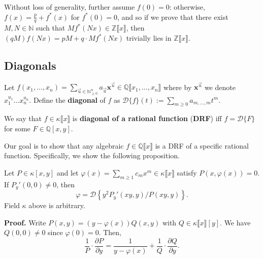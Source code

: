 \documentclass{template}
\begin{document}
Without loss of generality, further assume $f(0)=0$: otherwise, $f(x) = \frac{p}{q} + f^*(x)$ for $f^*(0)=0$, and so if we prove that there exist $M,N \in \mathbb{N}$ such that $Mf^*(Nx) \in \mathbb{Z}\llbracket x \rrbracket$, then $(qM)f(Nx)=pM+q \cdot Mf^*(Nx)$ trivially lies in $\mathbb{Z}\llbracket x \rrbracket$.

\subsection{Diagonals}

\begin{definition}
    Let $f(x_1,\dots,x_n) = \sum_{\vec{u} \in \mathbb{N}_{\geq 0}^n}a_{\vec{u}}\mathbf{x}^{\vec{u}} \in \mathbb{Q}\llbracket x_1,\dots, x_n \rrbracket$ where by $\mathbf{x}^{\vec{u}}$ we denote $x_1^{u_1}\dots x_n^{u_n}$.
    Define the \textbf{diagonal} of $f$ as $\mathcal{D}\{f\}(t) := \sum_{m\geq 0}a_{m,\dots,m}t^m$.
\end{definition}

\begin{definition}
    We say that $f \in \kappa \llbracket x \rrbracket$ is \textbf{diagonal of a rational function} (\textbf{DRF}) iff $f = \mathcal{D}\{F\}$ for some $F \in \mathbb{Q}[x,y]$.
\end{definition}

Our goal is to show that any algebraic $f \in \mathbb{Q}\llbracket x \rrbracket$ is a DRF of a specific rational function. 
Specifically, we show the following proposition.

\begin{proposition}\label{prop:drf}
    Let $P \in \kappa[x,y]$ and let $\varphi(x)=\sum_{m \geq 1}c_mx^m \in \kappa\llbracket x \rrbracket$ satisfy $P(x,\varphi(x))=0$.
    If $P_y'(0,0) \neq 0$, then
    \begin{equation*}
        \varphi = \mathcal{D}\left\{ y^2P_y'(xy,y) / P(xy, y) \right\}.
    \end{equation*} 
    Field $\kappa$ above is arbitrary.
\end{proposition}

\textbf{Proof.} Write $P(x,y) = (y-\varphi(x))Q(x,y)$ with $Q \in \kappa\llbracket x \rrbracket[y]$.
We have $Q(0,0) \neq 0$ since $\varphi(0)=0$. Then,
\begin{equation*}
    \frac{1}{P} \cdot \frac{\partial P}{\partial y} = \frac{1}{y-\varphi(x)} + \frac{1}{Q} \cdot \frac{\partial Q}{\partial y}.
\end{equation*}
\end{document}
